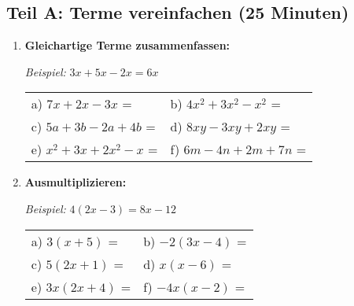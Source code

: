 \subsection*{Teil A: Terme vereinfachen (25 Minuten)}

\begin{enumerate}[label=\arabic*.]

    \item \textbf{Gleichartige Terme zusammenfassen:}

    \textit{Beispiel:} $3x + 5x - 2x = 6x$

    \vspace{0.5cm}
    \begin{tabular}{ll}
        a) $7x + 2x - 3x$ = \underline{\hspace{3cm}} & b) $4x^2 + 3x^2 - x^2$ = \underline{\hspace{3cm}} \\[2ex]
        c) $5a + 3b - 2a + 4b$ = \underline{\hspace{4cm}} & d) $8xy - 3xy + 2xy$ = \underline{\hspace{3cm}} \\[2ex]
        e) $x^2 + 3x + 2x^2 - x$ = \underline{\hspace{4cm}} & f) $6m - 4n + 2m + 7n$ = \underline{\hspace{4cm}}
    \end{tabular}

    \vspace{1cm}

    \item \textbf{Ausmultiplizieren:}

    \textit{Beispiel:} $4(2x - 3) = 8x - 12$

    \vspace{0.5cm}
    \begin{tabular}{ll}
        a) $3(x + 5)$ = \underline{\hspace{4cm}} & b) $-2(3x - 4)$ = \underline{\hspace{4cm}} \\[2ex]
        c) $5(2x + 1)$ = \underline{\hspace{4cm}} & d) $x(x - 6)$ = \underline{\hspace{4cm}} \\[2ex]
        e) $3x(2x + 4)$ = \underline{\hspace{4cm}} & f) $-4x(x - 2)$ = \underline{\hspace{4cm}}
    \end{tabular}


\end{enumerate}
